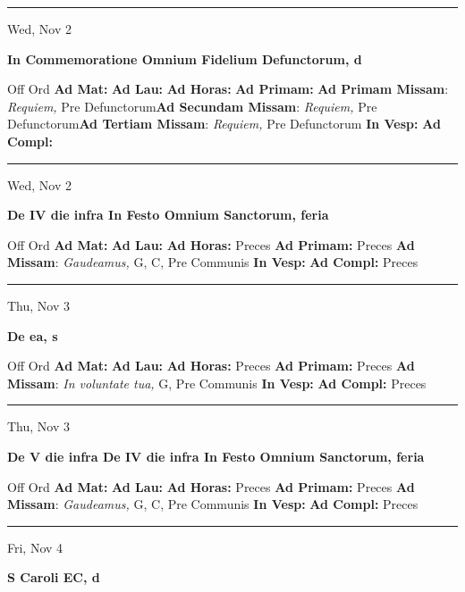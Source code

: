\documentclass[letterpaper, 10pt]{article}
\begin{document}
\hrule
\begin{center}
Wed, Nov 2
\end{center}\textbf{ \large In Commemoratione Omnium Fidelium Defunctorum, \textnormal{\normalsize d}}
\begin{justify}
Off Ord
\textbf{Ad Mat: }
\textbf{Ad Lau: }
\textbf{Ad Horas: }
\textbf{Ad Primam: }
\textbf{Ad Primam Missam}: \textit{Requiem,} Pre Defunctorum\textbf{Ad Secundam Missam}: \textit{Requiem,} Pre Defunctorum\textbf{Ad Tertiam Missam}: \textit{Requiem,} Pre Defunctorum
\textbf{In Vesp: }
\textbf{Ad Compl: }\end{justify}



\hrule
\begin{center}
Wed, Nov 2
\end{center}\textbf{ \large De IV die infra In Festo Omnium Sanctorum, \textnormal{\normalsize feria}}
\begin{justify}
Off Ord
\textbf{Ad Mat: }
\textbf{Ad Lau: }
\textbf{Ad Horas: }Preces
\textbf{Ad Primam: }Preces
\textbf{Ad Missam}: \textit{Gaudeamus,} G, C, Pre Communis
\textbf{In Vesp: }
\textbf{Ad Compl: }Preces\end{justify}



\hrule
\begin{center}
Thu, Nov 3
\end{center}\textbf{ \large De ea, \textnormal{\normalsize s}}
\begin{justify}
Off Ord
\textbf{Ad Mat: }
\textbf{Ad Lau: }
\textbf{Ad Horas: }Preces
\textbf{Ad Primam: }Preces
\textbf{Ad Missam}: \textit{In voluntate tua,} G, Pre Communis
\textbf{In Vesp: }
\textbf{Ad Compl: }Preces\end{justify}



\hrule
\begin{center}
Thu, Nov 3
\end{center}\textbf{ \large De V die infra De IV die infra In Festo Omnium Sanctorum, \textnormal{\normalsize feria}}
\begin{justify}
Off Ord
\textbf{Ad Mat: }
\textbf{Ad Lau: }
\textbf{Ad Horas: }Preces
\textbf{Ad Primam: }Preces
\textbf{Ad Missam}: \textit{Gaudeamus,} G, C, Pre Communis
\textbf{In Vesp: }
\textbf{Ad Compl: }Preces\end{justify}



\hrule
\begin{center}
Fri, Nov 4
\end{center}\textbf{ \large S Caroli EC, \textnormal{\normalsize d}}
\end{document}
